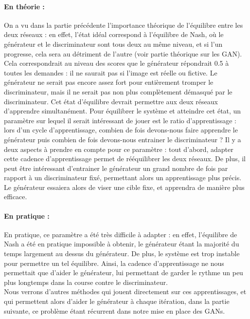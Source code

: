 \paragraph{En théorie :}
On a vu dans la partie précédente l'importance théorique de l'équilibre entre les deux réseaux : en effet, l'état idéal correspond à l'équilibre de Nash, où le générateur et le discriminateur sont tous deux au même niveau, et si l'un progresse, cela sera au détriment de l'autre (voir partie théorique sur les GAN). Cela correspondrait au niveau des scores que le générateur répondrait 0.5 à toutes les demandes : il ne saurait pas si l'image est réelle ou fictive. Le générateur ne serait pas encore assez fort pour entièrement tromper le discriminateur, mais il ne serait pas non plus complètement démasqué par le discriminateur. \newline
Cet état d'équilibre devrait permettre aux deux réseaux d'apprendre simultanément. Pour équilibrer le système et atteindre cet état, un paramètre sur lequel il serait intéressant de jouer est le ratio d'apprentissage : lors d'un cycle d'apprentissage, combien de fois devons-nous faire apprendre le générateur puis combien de fois devons-nous entrainer le discriminateur ? 
Il y a deux aspects à prendre en compte pour ce paramètre : tout d'abord, adapter cette cadence d'apprentissage permet de rééquilibrer les deux réseaux. De plus, il peut être intéressant d'entrainer le générateur un grand nombre de fois par rapport à un discriminateur fixé, permettant alors un apprentissage plus précis. Le générateur essaiera alors de viser une cible fixe, et apprendra de manière plus efficace.

\paragraph{En pratique :}
En pratique, ce paramètre a été très difficile à adapter : en effet, l'équilibre de Nash a été en pratique impossible à obtenir, le générateur étant la majorité du temps largement au dessus du générateur. De plus, le système est trop instable pour permettre un tel équilibre. Ainsi, la cadence d'apprentissage ne nous permettait que d'aider le générateur, lui permettant de garder le rythme un peu plus longtemps dans la course contre le discriminateur.\newline
\\
Nous verrons d'autres méthodes qui jouent directement sur ces apprentissages, et qui permettent alors d'aider le générateur à chaque itération, dans la partie suivante, ce problème étant récurrent dans notre mise en place des GANs.

